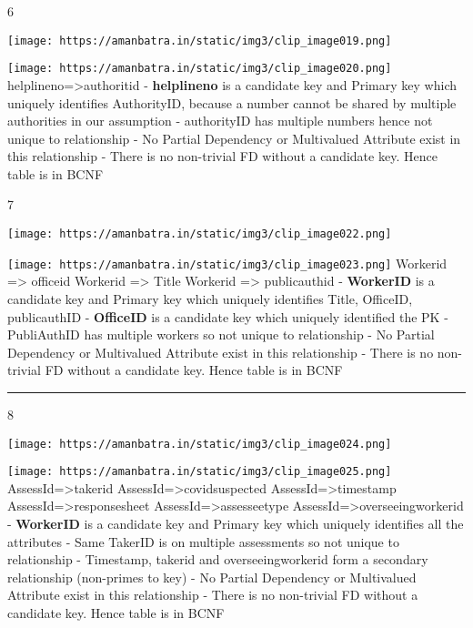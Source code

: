 \documentclass[
]{article}
\begin{document}
6

\texttt{[image: https://amanbatra.in/static/img3/clip\_image019.png]}

\texttt{[image: https://amanbatra.in/static/img3/clip\_image020.png]}
helplineno=\textgreater authoritid - \textbf{helplineno} is a candidate
key and Primary key which uniquely identifies AuthorityID, because a
number cannot be shared by multiple authorities in our assumption -
authorityID has multiple numbers hence not unique to relationship - No
Partial Dependency or Multivalued Attribute exist in this relationship -
There is no non-trivial FD without a candidate key. Hence table is in
BCNF

7

\texttt{[image: https://amanbatra.in/static/img3/clip\_image022.png]}

\texttt{[image: https://amanbatra.in/static/img3/clip\_image023.png]}
Workerid =\textgreater{} officeid Workerid =\textgreater{} Title
Workerid =\textgreater{} publicauthid - \textbf{WorkerID} is a candidate
key and Primary key which uniquely identifies Title, OfficeID,
publicauthID - \textbf{OfficeID} is a candidate key which uniquely
identified the PK - PubliAuthID has multiple workers so not unique to
relationship - No Partial Dependency or Multivalued Attribute exist in
this relationship - There is no non-trivial FD without a candidate key.
Hence table is in BCNF

\begin{center}\rule{0.5\linewidth}{0.5pt}\end{center}

8

\texttt{[image: https://amanbatra.in/static/img3/clip\_image024.png]}

\texttt{[image: https://amanbatra.in/static/img3/clip\_image025.png]}
AssessId=\textgreater takerid AssessId=\textgreater covidsuspected
AssessId=\textgreater timestamp AssessId=\textgreater responsesheet
AssessId=\textgreater assesseetype
AssessId=\textgreater overseeingworkerid - \textbf{WorkerID} is a
candidate key and Primary key which uniquely identifies all the
attributes - Same TakerID is on multiple assessments so not unique to
relationship - Timestamp, takerid and overseeingworkerid form a
secondary relationship (non-primes to key) - No Partial Dependency or
Multivalued Attribute exist in this relationship - There is no
non-trivial FD without a candidate key. Hence table is in BCNF
\end{document}
